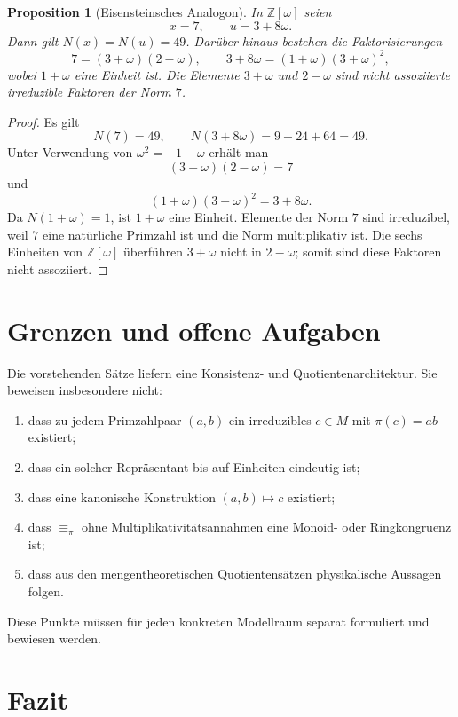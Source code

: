 \documentclass[11pt,a4paper,reqno]{amsart}
\newtheorem{proposition}[theorem]{Proposition}
\theoremstyle{definition}
\theoremstyle{remark}
\newcommand{\Z}{\mathbb{Z}}
\begin{document}
\begin{proposition}[Eisensteinsches Analogon]
In $\Z[\omega]$ seien
\[
  x=7,
  \qquad
  u=3+8\omega.
\]
Dann gilt $N(x)=N(u)=49$. Darüber hinaus bestehen die Faktorisierungen
\[
  7=(3+\omega)(2-\omega),
  \qquad
  3+8\omega=(1+\omega)(3+\omega)^2,
\]
wobei $1+\omega$ eine Einheit ist. Die Elemente $3+\omega$ und $2-\omega$ sind nicht assoziierte irreduzible Faktoren der Norm $7$.
\end{proposition}

\begin{proof}
Es gilt
\[
  N(7)=49,
  \qquad
  N(3+8\omega)=9-24+64=49.
\]
Unter Verwendung von $\omega^2=-1-\omega$ erhält man
\[
  (3+\omega)(2-\omega)=7
\]
und
\[
  (1+\omega)(3+\omega)^2=3+8\omega.
\]
Da $N(1+\omega)=1$, ist $1+\omega$ eine Einheit. Elemente der Norm $7$ sind irreduzibel, weil $7$ eine natürliche Primzahl ist und die Norm multiplikativ ist. Die sechs Einheiten von $\Z[\omega]$ überführen $3+\omega$ nicht in $2-\omega$; somit sind diese Faktoren nicht assoziiert.
\end{proof}

\section{Grenzen und offene Aufgaben}

Die vorstehenden Sätze liefern eine Konsistenz- und Quotientenarchitektur. Sie beweisen insbesondere nicht:
\begin{enumerate}[label=\textup{(\arabic*)}]
  \item dass zu jedem Primzahlpaar $(a,b)$ ein irreduzibles $c\in M$ mit $\pi(c)=ab$ existiert;
  \item dass ein solcher Repräsentant bis auf Einheiten eindeutig ist;
  \item dass eine kanonische Konstruktion $(a,b)\mapsto c$ existiert;
  \item dass $\equiv_\pi$ ohne Multiplikativitätsannahmen eine Monoid- oder Ringkongruenz ist;
  \item dass aus den mengentheoretischen Quotientensätzen physikalische Aussagen folgen.
\end{enumerate}

Diese Punkte müssen für jeden konkreten Modellraum separat formuliert und bewiesen werden.

\section{Fazit}
\end{document}
